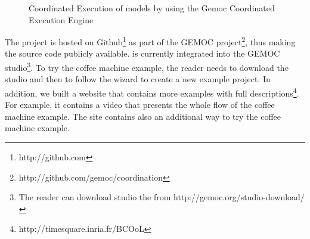 \begin{figure}[]
	\centering
	\caption{Coordinated Execution of models by using the Gemoc Coordinated Execution Engine}
	\label{fig:subfigureExample1}
\end{figure}

The project \bcool is hosted on Github\footnote{http://github.com} as part of the GEMOC project\footnote{http://github.com/gemoc/coordination}, thus making the source code publicly available. \bcool is currently integrated into the GEMOC studio\footnote{The reader can download studio the from http://gemoc.org/studio-download/}. To try the coffee machine example, the reader needs to download the studio and then to follow the wizard to create a new example project. In addition, we built a website that contains more examples with full descriptions\footnote{http://timesquare.inria.fr/BCOoL}. For example, it contains a video that presents the whole flow of the coffee machine example. The site contains also an additional way to try the coffee machine example. 

